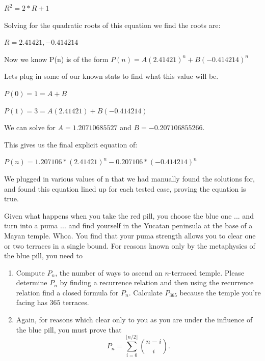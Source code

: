 \documentclass[10pt, AMS Euler]{article}
\begin{document}
	\bigskip
	\noindent
	$R^2 = 2*R + 1$

	\bigskip
	\noindent
	Solving for the quadratic roots of this equation we find the roots are: 

	\bigskip
	\noindent
	$R = 2.41421, -0.414214$


	\bigskip
	\noindent
	Now we know P(n) is of the form $P(n) = A(2.41421)^n + B(-0.414214)^n$

	\bigskip
	\noindent
	Lets plug in some of our known stats to find what this value will be. 

	\bigskip
	\noindent
	$P(0) = 1 = A + B$

	\bigskip
	\noindent
	$P(1) = 3 = A(2.41421) + B(-0.414214)$

	\bigskip
	\noindent
	We can solve for $A = 1.20710685527$ and $B = -0.207106855266$. 

	\bigskip
	\noindent
	This gives us the final explicit equation of:

	\bigskip
	\noindent
	$\boxed{P(n) = 1.207106*(2.41421)^n - 0.207106*(-0.414214)^n}$

	\bigskip
	\noindent
	We plugged in various values of n that we had manually found the solutions for, and found this equation lined up for each tested case, proving the equation is true. 






	

	\bigskip
	\noindent
	  Given what happens when you take the red pill, you choose the blue one ... and turn into a puma ...  and find yourself in the Yucatan peninsula at the base of a Mayan temple.  Whoa.  
	You find that your puma strength allows you to clear one or two terraces in a single bound.  
	For reasons known only by the metaphysics of the blue pill, you need to 
	
	\begin{enumerate}
		\item Compute $P_n$, the number of ways to ascend an 
		$n$-terraced temple. Please determine $P_n$ by finding a recurrence relation and then using the recurrence relation find a closed formula for $P_n$.  
		Calculate $P_{365}$ because the temple you're facing has $365$ terraces.
		
		\item Again, for reasons which clear only to you as you are under the influence of the blue pill, you must prove that 
		$$P_n = \sum_{i=0}^{\lfloor n/2 \rfloor}\binom{n-i}{i}.$$
	\end{enumerate}
	
\end{document}
